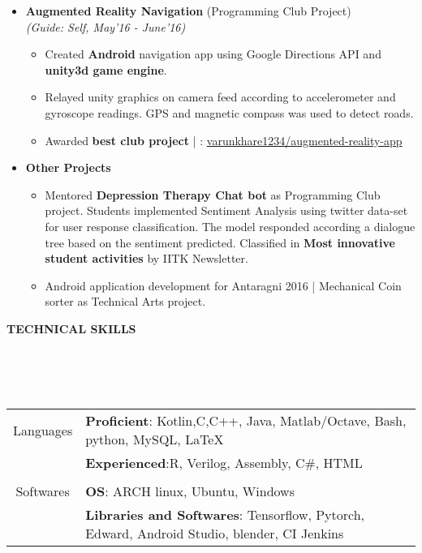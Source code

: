 \documentclass[a4paper,10pt]{article}
\newcommand{\isep}{-2 pt}
\newcommand{\lsep}{-0.5cm}
\newcommand{\resheading}[1]{{\small \colorbox{mygrey}{\begin{minipage}{0.975\textwidth}{\textbf{#1 \vphantom{p\^{E}}}}\end{minipage}}}}
\begin{document}
\begin{itemize}
\item \textbf{Augmented Reality Navigation} (Programming Club Project) \\
 \emph{(Guide: Self, May'16 - June'16)} \\[-0.6cm]
	\begin{itemize}\itemsep \isep
	\item Created \textbf{Android} navigation app using Google Directions API and \textbf{unity3d game engine}.
	\item Relayed unity graphics on camera feed according to accelerometer and gyroscope readings. GPS and magnetic compass was used to detect roads.
	\item Awarded \textbf{best club project} | \faGithub : \href{https://github.com/varunkhare1234/augmented-reality-app}{varunkhare1234/augmented-reality-app}
	\end{itemize}

\item\textbf{Other Projects}
    \begin{itemize}
    \item Mentored \textbf{Depression Therapy Chat bot} as Programming Club project. Students implemented Sentiment Analysis using twitter data-set for user response classification. The model responded according a dialogue tree based on the sentiment predicted. Classified in \textbf{Most innovative student activities} by IITK Newsletter.
    \item Android application development for Antaragni 2016 | Mechanical Coin sorter as Technical Arts project.
    \end{itemize}
\end{itemize}	

\resheading{\textbf{TECHNICAL SKILLS} }\\[\lsep]
\\ \\
\indent \begin{tabular}{c @{\hskip 0.3in}| @{\hskip 0.1in}l}
    Languages & \textbf{Proficient}: Kotlin,C,C++, Java, Matlab/Octave, Bash, python, MySQL, \LaTeX \\
     & \textbf{Experienced}:R, Verilog, Assembly, C\#, HTML\\
     \\
     Softwares & \textbf{OS}: ARCH linux, Ubuntu, Windows\\
     & \textbf{Libraries and Softwares}: Tensorflow, Pytorch, Edward, Android Studio, blender, CI Jenkins
\end{tabular}\\ \\
\end{document}
